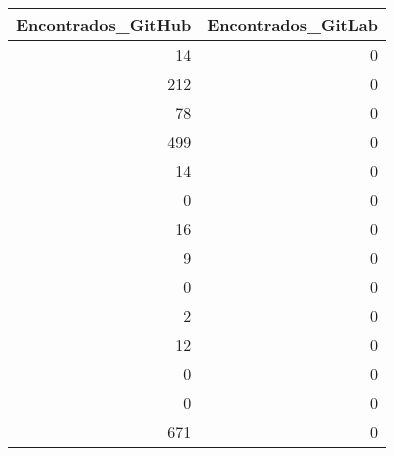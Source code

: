 \begin{tabular}{rr}
\toprule
 Encontrados\_GitHub &  Encontrados\_GitLab \\
\midrule
                 14 &                   0 \\
                212 &                   0 \\
                 78 &                   0 \\
                499 &                   0 \\
                 14 &                   0 \\
                  0 &                   0 \\
                 16 &                   0 \\
                  9 &                   0 \\
                  0 &                   0 \\
                  2 &                   0 \\
                 12 &                   0 \\
                  0 &                   0 \\
                  0 &                   0 \\
                671 &                   0 \\
\bottomrule
\end{tabular}
